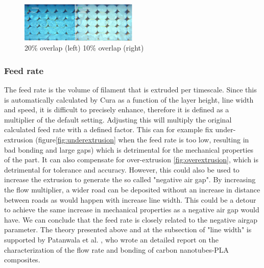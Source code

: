 \begin{figure}[H]
    \centering
    \includegraphics[width=0.5\textwidth]{chapter_2/figures/Meso10and20.jpg}
    \caption{20\% overlap (left) 10\% overlap (right)\cite{Somireddy2017MechanicalMesostructure}}
    \label{fig:Meso10&20}
\end{figure}

\subsubsection{Feed rate}
The feed rate is the volume of filament that is extruded per timescale. Since this is automatically calculated by Cura as a function of the layer height, line width and speed, it is difficult to precisely enhance, therefore it is defined as a multiplier of the default setting. Adjusting this will multiply the original calculated feed rate with a defined factor. This can for example fix under-extrusion (figure\ref{fig:underextrusion} when the feed rate is too low, resulting in bad bonding and large gaps) which is detrimental for the mechanical properties of the part. It can also compensate for over-extrusion \ref{fig:overextrusion}, which is detrimental for tolerance and accuracy. However, this could also be used to increase the extrusion to generate the so called "negative air gap". By increasing the flow multiplier, a wider road can be deposited without an increase in distance between roads as would happen with increase line width. This could be a detour to achieve the same increase in mechanical properties as a negative air gap would have.
We can conclude that the feed rate is closely related to the negative airgap parameter. The theory presented above and at the subsection of "line width" is supported by Patanwala et al. \cite{Patanwala2018TheComposites}, who wrote an detailed report on the characterization of the flow rate and bonding of carbon nanotubes-PLA composites.  
